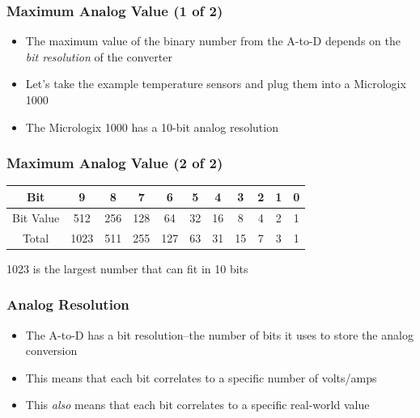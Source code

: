 \begin{frame}
    \frametitle{Maximum Analog Value (1 of 2)}

    \begin{itemize}
        \item The maximum value of the binary number from the A-to-D depends on the \emph{bit resolution} of the converter
        \item Let's take the example temperature sensors and plug them into a Micrologix 1000
        \item The Micrologix 1000 has a 10-bit analog resolution
    \end{itemize}
\end{frame}

\begin{frame}
    \frametitle{Maximum Analog Value (2 of 2)}

    \begin{table}
        \centering
        \begin{tabular}{|c|c|c|c|c|c|c|c|c|c|c|}
            \hline
            Bit & 9 & 8 & 7 & 6 & 5 & 4 & 3 & 2 & 1 & 0\\
            \hline
            Bit Value & 512 & 256 & 128 & 64 & 32 & 16 & 8 & 4 & 2 & 1\\
            \hline
            Total & \textcolor{BakerADARed}{1023} & 511 & 255 & 127 & 63 & 31 & 15 & 7 & 3 & 1\\
            \hline
        \end{tabular}
    \end{table}

    \vspace{1em}
    \centering
    {\footnotesize 1023 is the largest number that can fit in 10 bits\par}
\end{frame}

\begin{frame}
    \frametitle{Analog Resolution}

    \begin{itemize}
        \item The A-to-D has a bit resolution--the number of bits it uses to store the analog conversion
        \item This means that each bit correlates to a specific number of volts/amps 
        \item This \emph{also} means that each bit correlates to a specific real-world value
    \end{itemize}
\end{frame}

